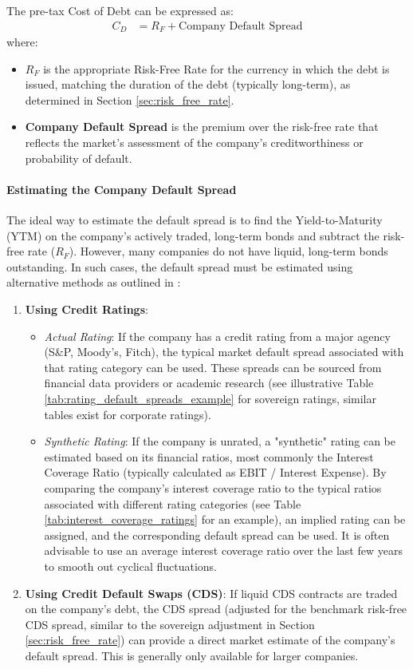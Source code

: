 The pre-tax Cost of Debt can be expressed as:
\begin{align*}
    C_D & = R_F + \text{Company Default Spread}
\end{align*}
where:
\begin{itemize}
    \item \(R_F\) is the appropriate Risk-Free Rate for the currency in which the debt is issued, matching the duration of the debt (typically long-term), as determined in Section \ref{sec:risk_free_rate}.
    \item \textbf{Company Default Spread} is the premium over the risk-free rate that reflects the market's assessment of the company's creditworthiness or probability of default.
\end{itemize}

\paragraph{Estimating the Company Default Spread}
The ideal way to estimate the default spread is to find the Yield-to-Maturity (YTM) on the company's actively traded, long-term bonds and subtract the risk-free rate (\(R_F\)). However, many companies do not have liquid, long-term bonds outstanding. In such cases, the default spread must be estimated using alternative methods as outlined in \parencite{damodaran2025investment}:
\begin{enumerate}
    \item \textbf{Using Credit Ratings}:
          \begin{itemize}
              \item \textit{Actual Rating}: If the company has a credit rating from a major agency (S\&P, Moody's, Fitch), the typical market default spread associated with that rating category can be used. These spreads can be sourced from financial data providers or academic research (see illustrative Table \ref{tab:rating_default_spreads_example} for sovereign ratings, similar tables exist for corporate ratings).
              \item \textit{Synthetic Rating}: If the company is unrated, a "synthetic" rating can be estimated based on its financial ratios, most commonly the Interest Coverage Ratio (typically calculated as EBIT / Interest Expense). By comparing the company's interest coverage ratio to the typical ratios associated with different rating categories (see Table \ref{tab:interest_coverage_ratings} for an example), an implied rating can be assigned, and the corresponding default spread can be used. It is often advisable to use an average interest coverage ratio over the last few years to smooth out cyclical fluctuations.
          \end{itemize}
    \item \textbf{Using Credit Default Swaps (CDS)}: If liquid CDS contracts are traded on the company's debt, the CDS spread (adjusted for the benchmark risk-free CDS spread, similar to the sovereign adjustment in Section \ref{sec:risk_free_rate}) can provide a direct market estimate of the company's default spread. This is generally only available for larger companies.
\end{enumerate}


